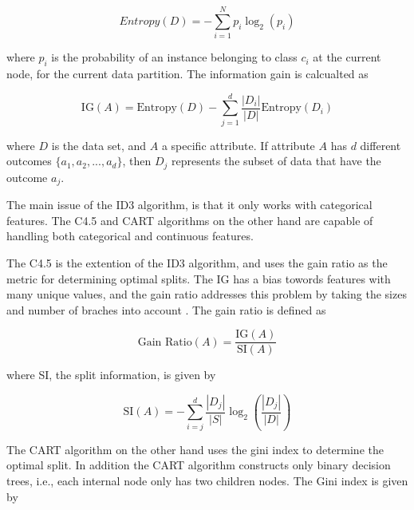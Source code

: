\documentclass[conference]{IEEEtran}
\begin{document}
        \begin{equation}
            Entropy(D) = - \sum_{i=1}^{N} p_i \log_2(p_i)
        \end{equation}
                
        where $p_{i}$ is the probability of an instance belonging to class $c_{i}$ at the current node, for the current
        data partition. The information gain is calcualted as

        \begin{equation}
            \text{IG}(A) = \text{Entropy}(D) - \sum_{j=1}^{d} \frac{|D_i|}{|D|} \text{Entropy}(D_i)
        \end{equation}
            
        where $D$ is the data set, and $A$ a specific attribute. If attribute $A$ has $d$ different outcomes
        $\{a_1, a_2, ..., a_d\}$, then $D_j$ represents the subset of data that have the outcome $a_j$.

        The main issue of the ID3 algorithm, is that it only works with categorical features. The C4.5 \cite{DT_quinlan1993}
        and CART \cite{DT_breiman1984classification} algorithms on the other hand are capable of handling both categorical and
        continuous features.

        The C4.5 is the extention of the ID3 algorithm, and uses the gain ratio as the metric for determining optimal
        splits. The IG has a bias towords features with many unique values, and the gain ratio addresses
        this problem by taking the sizes and number of braches into account \cite{Kelleher2015}. The gain ratio is defined as

        \begin{equation}
            \text{Gain Ratio}(A) = \frac{\text{IG}(A)}{\text{SI}(A)}
        \end{equation}
            
        where SI, the split information, is given by

        \begin{equation}
            \text{SI}(A) = - \sum_{i=j}^{d} \frac{|D_j|}{|S|} \log_2 \left( \frac{|D_j|}{|D|} \right)
        \end{equation}
            
        The CART algorithm \cite{DT_breiman1984classification} on the other hand uses the gini index to determine
        the optimal split. In addition the CART algorithm constructs only binary decision trees, i.e., each internal
        node only has two children nodes. The Gini index is given by 
\end{document}
